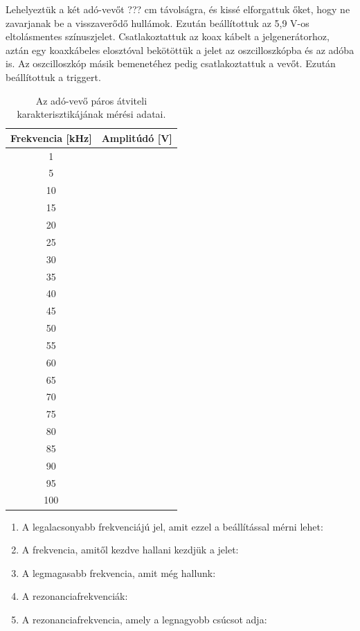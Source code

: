 \documentclass{article}
\begin{document}
Lehelyeztük a két adó-vevőt ??? cm távolságra, és kissé elforgattuk őket, hogy ne zavarjanak be a visszaverődő hullámok. Ezután beállítottuk az 5,9 V-os eltolásmentes színuszjelet. Csatlakoztattuk az koax kábelt a jelgenerátorhoz, aztán egy koaxkábeles elosztóval bekötöttük a jelet az oszcilloszkópba és az adóba is. Az oszcilloszkóp másik bemenetéhez pedig csatlakoztattuk a vevőt. Ezután beállítottuk a triggert.

\begin{table}[h!]
    \centering
    \begin{tabular}{|c|c|}
        \hline
        Frekvencia [kHz] & Amplitúdó [V] \\ \hline
        1 & \\ \hline
        5 & \\ \hline
        10 & \\ \hline
        15 & \\ \hline
        20 & \\ \hline
        25 & \\ \hline
        30 & \\ \hline
        35 & \\ \hline
        40 & \\ \hline
        45 & \\ \hline
        50 & \\ \hline
        55 & \\ \hline
        60 & \\ \hline
        65 & \\ \hline
        70 & \\ \hline
        75 & \\ \hline
        80 & \\ \hline
        85 & \\ \hline
        90 & \\ \hline
        95 & \\ \hline
        100 & \\ \hline
    \end{tabular}
    \caption{Az adó-vevő páros átviteli karakterisztikájának mérési adatai.}
    \label{tab:atviteli_karakterisztika}
\end{table}


\begin{enumerate}
    \item A legalacsonyabb frekvenciájú jel, amit ezzel a beállítással mérni lehet: 
    \item A frekvencia, amitől kezdve hallani kezdjük a jelet: 
    \item A legmagasabb frekvencia, amit még hallunk: 
    \item A rezonanciafrekvenciák: 
    \item A rezonanciafrekvencia, amely a legnagyobb csúcsot adja: 
\end{enumerate}
\end{document}

